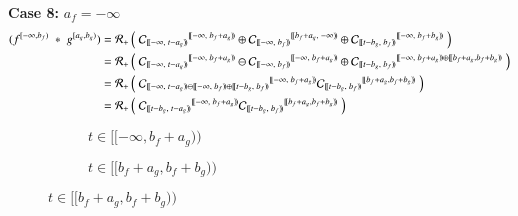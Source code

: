 \textbf{Case 8:} $a_f=-\infty$
\begin{align*}
	(f^{[-\infty,b_f)} \;*\; g^{[a_g,b_g)})
	= \R[+] &\left( \; 
			{\C[ [\![-\infty,\;t-a_g)\!) ]}^{[\![-\infty,\; b_f+a_g)\!)} \oplus
			{\C[ [\![-\infty,\;b_f)\!) ]}^{[\![b_f+a_g,\; -\infty)\!)} \oplus
			{\C[ [\![t-b_g,\;b_f)\!) ]}^{[\![-\infty,\; b_f+b_g)\!)} 
		\; \right) \\	
	= \R[+] &\left( \; 
			{\C[ [\![-\infty,\;t-a_g)\!) ]}^{[\![-\infty,\; b_f+a_g)\!)} \ominus
			{\C[ [\![-\infty,\;b_f)\!) ]}^{[\![-\infty, \; b_f+a_g)\!)} \oplus
			{\C[ [\![t-b_g,\;b_f)\!) ]}^{[\![-\infty,\; b_f+a_g)\!)\oplus[\![b_f+a_g, b_f+b_g)\!)} 
		\; \right) \\
	= \R[+] &\left( \; 
			{\C[ [\![-\infty,\;t-a_g)\!)\ominus[\![-\infty,\;b_f)\!)\oplus[\![t-b_g,\;b_f)\!) ]}^{[\![-\infty,\; b_f+a_g)\!)} 
			{\C[ [\![t-b_g,\;b_f)\!) ]}^{[\![b_f+a_g, b_f+b_g)\!)} 
		\; \right) \\
	= \R[+] &\left( \; 
			{\C[ [\![t-b_g,\;t-a_g)\!) ]}^{[\![-\infty,\; b_f+a_g)\!)} 
			{\C[ [\![t-b_g,\;b_f)\!) ]}^{[\![b_f+a_g, b_f+b_g)\!)} 
		\; \right)
\end{align*}
\vspace{-1.5cm}
\begin{figure}[h]
	\centering
	\begin{subfigure}[h]{0.4\textwidth}
		\caption{$t \in [\![-\infty, b_f+a_g)\!)$} 
		\centering
	\end{subfigure}
	\begin{subfigure}[h]{0.4\textwidth}
		\caption{$t \in [\![b_f+a_g, b_f+b_g)\!)$} 
		\centering
	\end{subfigure}
\end{figure}


